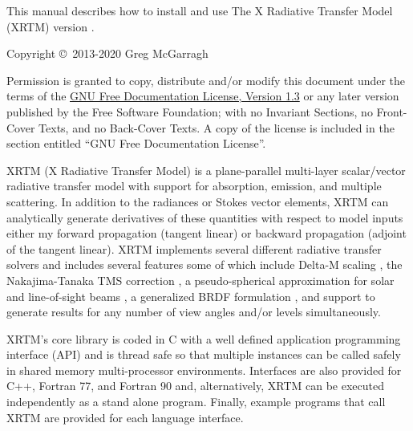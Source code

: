 %
\null
\iftth
\vspace{0.25in}
\else
\vfill
\fi
{
\setlength{\parskip}{7.5pt}

\noindent
This manual describes how to install and use The X Radiative Transfer Model (XRTM) version \version.

\noindent
Copyright \copyright \ 2013-2020 Greg McGarragh

\noindent
Permission is granted to copy, distribute and/or modify this document under the terms of the \href{http://www.gnu.org/licenses/fdl-1.3.html}{GNU Free Documentation License, Version 1.3} or any later version published by the Free Software Foundation; with no Invariant Sections, no Front-Cover Texts, and no Back-Cover Texts.  A copy of the license is included in the section entitled ``GNU Free Documentation License''.
}


%
\tableofcontents


%
\mainmatter


\setlength{\parskip}{5.0pt}


\label{introduction_to_xrtm}

XRTM (X Radiative Transfer Model) is a plane-parallel multi-layer scalar/vector radiative transfer model with support for absorption, emission, and multiple scattering.   In addition to the radiances or Stokes vector elements, XRTM can analytically generate derivatives of these quantities with respect to model inputs either my forward propagation (tangent linear) or backward propagation (adjoint of the tangent linear).  XRTM implements several different radiative transfer solvers and includes several features some of which include Delta-M scaling \citep{wiscombe_w_j_1977a}, the Nakajima-Tanaka TMS correction \citep{nakajima_t_1988}, a pseudo-spherical approximation for solar and line-of-sight beams \citep{dahlback_arne_1991}, a generalized BRDF formulation \citep{spurr_r_j_d_2004}, and support to generate results for any number of view angles and/or levels simultaneously.

XRTM's core library is coded in C with a well defined application programming interface (API) and is thread safe so that multiple instances can be called safely in shared memory multi-processor environments.  Interfaces are also provided for C++, Fortran 77, and Fortran 90 and, alternatively, XRTM can be executed independently as a stand alone program.  Finally, example programs that call XRTM are provided for each language interface.

